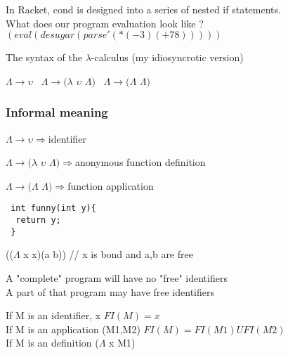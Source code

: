 \documentclass{article}
\begin{document}
\begin{flushleft}
In Racket, cond is designed into a series of nested if statements.\\
What does our program evaluation look like ?
$(eval(desugar(parse '(* (-3)(+ 7 8)))))$
\end{flushleft}


\begin{flushleft}
The syntax of the $\lambda$-calculus (my idiosyncrotic version)
\end{flushleft}

\begin{flushleft}
\center
$\Lambda\rightarrow\upsilon$\
\center
$\Lambda\rightarrow(\lambda$ 
$\upsilon$
$\Lambda)$\
\center
$\Lambda\rightarrow(\Lambda$
$\Lambda)$
\
\end{flushleft}

\begin{flushleft}
\subsubsection*{Informal meaning}
\end{flushleft}
\begin{flushleft}

$\Lambda\rightarrow\upsilon\Longrightarrow$identifier

$\Lambda\rightarrow(\lambda$ 
$\upsilon$
$\Lambda)\Longrightarrow$anonymous function definition

$\Lambda\rightarrow(\Lambda$
$\Lambda)\Longrightarrow$function application
\end{flushleft}


\begin{verbatim} 
 int funny(int y){ 
  return y;
 } 
\end{verbatim}
%
\begin{flushleft}
(($\Lambda$ x x)(a b)) // x is bond and a,b are free
\end{flushleft}

\begin{flushleft}
A "complete" program will have no "free" identifiers\\
A part of that program may have free identifiers
\end{flushleft}

\begin{flushleft}
If M is an identifier, x $FI(M)={x}$\\
If M is an application (M1,M2) $FI(M)=FI(M1) U FI(M2)$\\
If M is an definition ($\Lambda$ x M1)
\end{flushleft}
\end{document}
